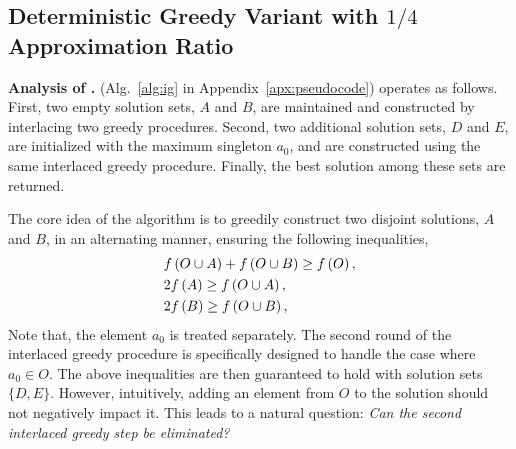 \subsection{Deterministic Greedy Variant with $1/4$ Approximation Ratio}
\label{sec:greedy-1/4}
\textbf{Analysis of \ig.}
\ig (Alg.~\ref{alg:ig} in Appendix~\ref{apx:pseudocode}) operates as follows.
First, two empty solution sets, $A$ and $B$, are maintained
and constructed by interlacing two greedy procedures.
Second, two additional solution sets, $D$ and $E$, are initialized with the maximum singleton $a_0$,
and are constructed using the same interlaced greedy procedure.
Finally, the best solution among these sets are returned.

The core idea of the algorithm is to greedily construct two disjoint solutions,
$A$ and $B$, in an alternating manner,
ensuring the following inequalities,
\begin{align}
    &f \left( O\cup A \right) + f \left( O\cup B \right) \ge f \left( O \right), \label{inq:gdone-opt}\\
    &2f \left( A \right) \ge f \left( O\cup A \right),\label{inq:gdone-A}\\
    &2f \left( B \right) \ge f \left( O\cup B \right),\label{inq:gdone-B}
\end{align}
Note that, the element $a_0$ is treated separately.
The second round of the interlaced greedy procedure is specifically designed to
handle the case where $a_0\in O$.
The above inequalities are then guaranteed to hold with solution sets $\{D, E\}$.
However, intuitively, adding an element from $O$ to the solution should not negatively impact it.
This leads to a natural question: 
\textit{Can the second interlaced greedy step be eliminated?}    



